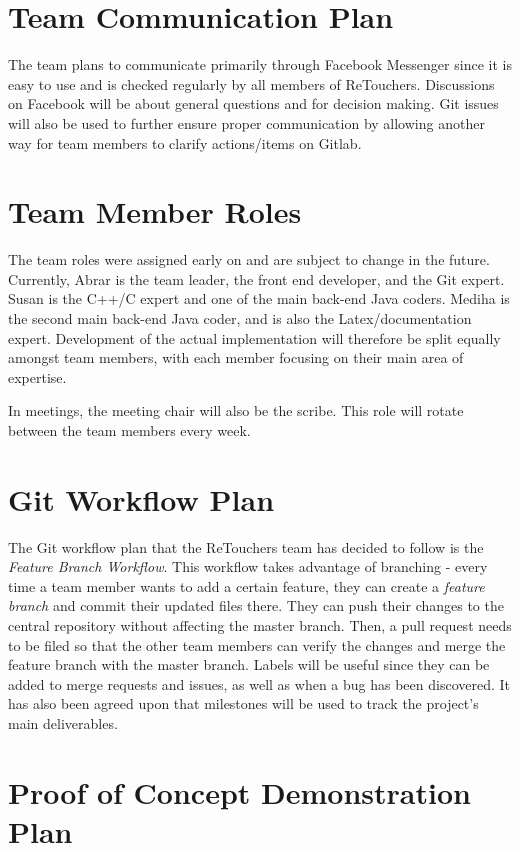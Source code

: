 \documentclass{article}
\begin{document}
\section{Team Communication Plan}

	The team plans to communicate primarily through Facebook Messenger since it is easy to use and is checked regularly by all members of ReTouchers. Discussions on Facebook will be about general questions and for decision making. Git issues will also be used to further ensure proper communication by allowing another way for team members to clarify actions/items on Gitlab. 

\section{Team Member Roles}

	The team roles were assigned early on and are subject to change in the future. Currently, Abrar is the team leader, the front end developer, and the Git expert. Susan is the C++/C expert and one of the main back-end Java coders. Mediha is the second main back-end Java coder, and is also the Latex/documentation expert. Development of the actual implementation will therefore be split equally amongst team members, with each member focusing on their main area of expertise.

	In meetings, the meeting chair will also be the scribe. This role will rotate between the team members every week.

\section{Git Workflow Plan}

	The Git workflow plan that the ReTouchers team has decided to follow is the \textit{Feature Branch Workflow}. This workflow takes advantage of branching - every time a team member wants to add a certain feature, they can create a\textit{ feature branch} and commit their updated files there. They can push their changes to the central repository without affecting the master branch. Then, a pull request needs to be filed so that the other team members can verify the changes and merge the feature branch with the master branch. Labels will be useful since they can be added to merge requests and issues, as well as when a bug has been discovered. It has also been agreed upon that milestones will be used to track the project's main deliverables.

\section{Proof of Concept Demonstration Plan}
\end{document}
